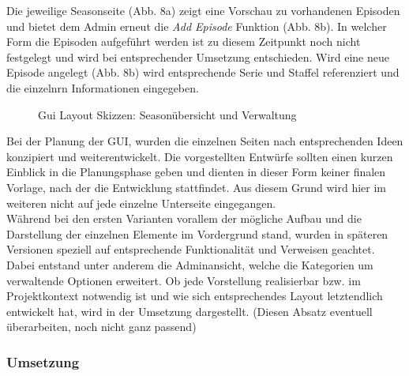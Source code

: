 Die jeweilige Seasonseite (Abb. 8a) zeigt eine Vorschau zu vorhandenen Episoden und bietet dem Admin erneut die \textit{Add Episode} Funktion (Abb. 8b). In welcher Form die Episoden aufgeführt werden ist zu diesem Zeitpunkt noch nicht festgelegt und wird bei entsprechender Umsetzung entschieden. Wird eine neue Episode angelegt (Abb. 8b) wird entsprechende Serie und Staffel referenziert und die einzelnrn Informationen eingegeben.\\
\begin{figure} [h!]
\centering
\hfill %
\hfill %
\hfill %
\caption{Gui Layout Skizzen: Seasonübersicht und Verwaltung }
\label{gui-skizzen-season-verwaltung}
\end{figure}

Bei der Planung der GUI, wurden die einzelnen Seiten nach entsprechenden Ideen konzipiert und weiterentwickelt. Die vorgestellten Entwürfe sollten einen kurzen Einblick in die Planungsphase geben und dienten in dieser Form keiner finalen Vorlage, nach der die Entwicklung stattfindet. Aus diesem Grund wird hier im weiteren nicht auf jede einzelne Unterseite eingegangen.\\ Während bei den ersten Varianten vorallem der mögliche Aufbau und die Darstellung der einzelnen Elemente im Vordergrund stand, wurden in späteren Versionen speziell auf entsprechende Funktionalität und Verweisen geachtet. Dabei entstand unter anderem die Adminansicht, welche die Kategorien um verwaltende Optionen erweitert. Ob jede Vorstellung realisierbar bzw. im Projektkontext notwendig ist und wie sich entsprechendes Layout letztendlich entwickelt hat, wird in der Umsetzung dargestellt. (Diesen Absatz eventuell überarbeiten, noch nicht ganz passend) \\

\newpage
\subsubsection{Umsetzung}
